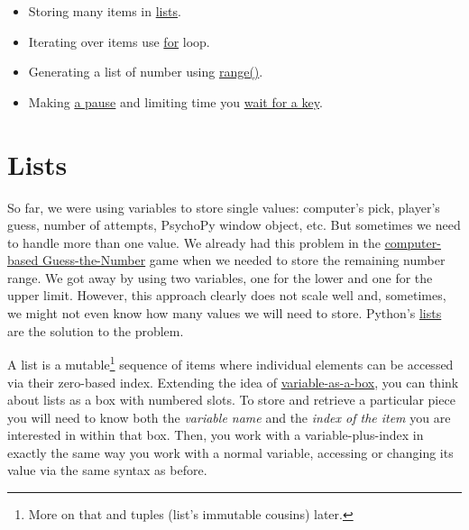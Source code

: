 \documentclass[
]{book}
\providecommand{\tightlist}{%
  \setlength{\itemsep}{0pt}\setlength{\parskip}{0pt}}
\begin{document}
\begin{itemize}
\tightlist
\item
  Storing many items in \protect\hyperlink{lists}{lists}.
\item
  Iterating over items use \protect\hyperlink{for-loop}{for} loop.
\item
  Generating a list of number using \protect\hyperlink{range}{range()}.
\item
  Making \protect\hyperlink{clock-wait}{a pause} and limiting time you \protect\hyperlink{waitKeys-maxwait}{wait for a key}.
\end{itemize}

\hypertarget{lists}{%
\section{Lists}\label{lists}}

So far, we were using variables to store single values: computer's pick, player's guess, number of attempts, PsychoPy window object, etc. But sometimes we need to handle more than one value. We already had this problem in the \protect\hyperlink{guess-the-number-ai}{computer-based Guess-the-Number} game when we needed to store the remaining number range. We got away by using two variables, one for the lower and one for the upper limit. However, this approach clearly does not scale well and, sometimes, we might not even know how many values we will need to store. Python's \href{https://docs.python.org/3/library/stdtypes.html\#lists}{lists} are the solution to the problem.

A list is a mutable\footnote{More on that and tuples (list's immutable cousins) later.} sequence of items where individual elements can be accessed via their zero-based index. Extending the idea of \protect\hyperlink{variables}{variable-as-a-box}, you can think about lists as a box with numbered slots. To store and retrieve a particular piece you will need to know both the \emph{variable name} and the \emph{index of the item} you are interested in within that box. Then, you work with a variable-plus-index in exactly the same way you work with a normal variable, accessing or changing its value via the same syntax as before.
\end{document}

